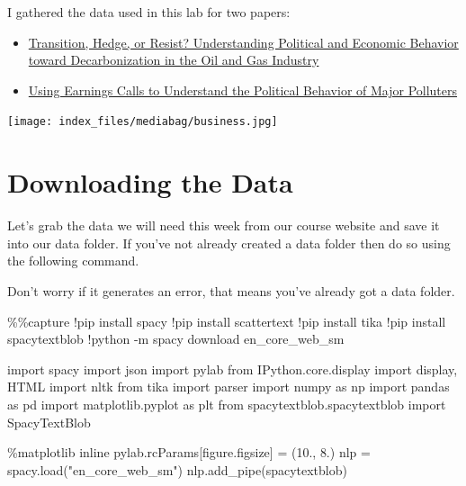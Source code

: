 \documentclass[
  letterpaper,
  DIV=11,
  numbers=noendperiod]{scrreprt}
\newenvironment{Shaded}{\begin{snugshade}}{\end{snugshade}}
\newcommand{\FloatTok}[1]{\textcolor[rgb]{0.68,0.00,0.00}{#1}}
\newcommand{\ImportTok}[1]{\textcolor[rgb]{0.00,0.46,0.62}{#1}}
\newcommand{\NormalTok}[1]{\textcolor[rgb]{0.00,0.23,0.31}{#1}}
\newcommand{\OperatorTok}[1]{\textcolor[rgb]{0.37,0.37,0.37}{#1}}
\newcommand{\StringTok}[1]{\textcolor[rgb]{0.13,0.47,0.30}{#1}}
\begin{document}
I gathered the data used in this lab for two papers:

\begin{itemize}
\item
  \href{https://discovery.ucl.ac.uk/id/eprint/10196075/1/ssrn-3694447.pdf}{Transition,
  Hedge, or Resist? Understanding Political and Economic Behavior toward
  Decarbonization in the Oil and Gas Industry}
\item
  \href{https://muse.jhu.edu/article/847625}{Using Earnings Calls to
  Understand the Political Behavior of Major Polluters}
\end{itemize}

\texttt{[image: index\_files/mediabag/business.jpg]}

\hypertarget{downloading-the-data-1}{%
\section{Downloading the Data}\label{downloading-the-data-1}}

Let's grab the data we will need this week from our course website and
save it into our data folder. If you've not already created a data
folder then do so using the following command.

Don't worry if it generates an error, that means you've already got a
data folder.

\begin{Shaded}
\begin{Highlighting}[]
\OperatorTok{\%\%}\NormalTok{capture}
\OperatorTok{!}\NormalTok{pip install spacy}
\OperatorTok{!}\NormalTok{pip install scattertext}
\OperatorTok{!}\NormalTok{pip install tika}
\OperatorTok{!}\NormalTok{pip install spacytextblob}
\OperatorTok{!}\NormalTok{python }\OperatorTok{{-}}\NormalTok{m spacy download en\_core\_web\_sm}
\end{Highlighting}
\end{Shaded}

\begin{Shaded}
\begin{Highlighting}[]
\ImportTok{import}\NormalTok{ spacy}
\ImportTok{import}\NormalTok{ json}
\ImportTok{import}\NormalTok{ pylab}
\ImportTok{from}\NormalTok{ IPython.core.display }\ImportTok{import}\NormalTok{ display, HTML}
\ImportTok{import}\NormalTok{ nltk}
\ImportTok{from}\NormalTok{ tika }\ImportTok{import}\NormalTok{ parser}
\ImportTok{import}\NormalTok{ numpy }\ImportTok{as}\NormalTok{ np}
\ImportTok{import}\NormalTok{ pandas }\ImportTok{as}\NormalTok{ pd}
\ImportTok{import}\NormalTok{ matplotlib.pyplot }\ImportTok{as}\NormalTok{ plt}
\ImportTok{from}\NormalTok{ spacytextblob.spacytextblob }\ImportTok{import}\NormalTok{ SpacyTextBlob}

\OperatorTok{\%}\NormalTok{matplotlib inline}
\NormalTok{pylab.rcParams[}\StringTok{\textquotesingle{}figure.figsize\textquotesingle{}}\NormalTok{] }\OperatorTok{=}\NormalTok{ (}\FloatTok{10.}\NormalTok{, }\FloatTok{8.}\NormalTok{)}
\NormalTok{nlp }\OperatorTok{=}\NormalTok{ spacy.load(}\StringTok{"en\_core\_web\_sm"}\NormalTok{)}
\NormalTok{nlp.add\_pipe(}\StringTok{\textquotesingle{}spacytextblob\textquotesingle{}}\NormalTok{)}
\end{Highlighting}
\end{Shaded}
\end{document}
